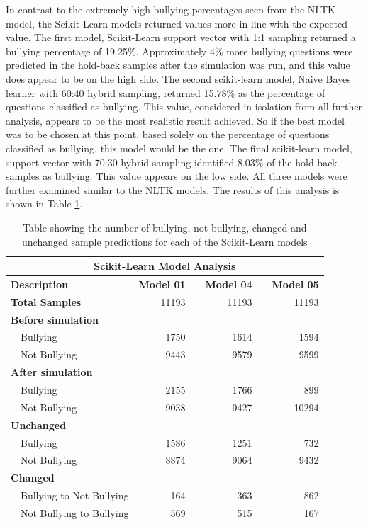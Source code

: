 In contrast to the extremely high bullying percentages seen from the NLTK model, the Scikit-Learn models returned values more in-line with the expected value. The first model, Scikit-Learn support vector with 1:1 sampling returned a bullying percentage of 19.25\%. Approximately 4\% more bullying questions were predicted in the hold-back samples after the simulation was run, and this value does appear to be on the high side. The second scikit-learn model, Naive Bayes learner with 60:40 hybrid sampling, returned 15.78\% as the percentage of questions classified as bullying. This value, considered in isolation from all further analysis, appears to be the most realistic result achieved. So if the best model was to be chosen at this point, based solely on the percentage of questions classified as bullying, this model would be the one. The final scikit-learn model, support vector with 70:30 hybrid sampling identified 8.03\% of the hold back samples as bullying. This value appears on the low side. All three models were further examined similar to the NLTK models. The results of this analysis is shown in Table \ref{tab:chapter5:scikit_model_analysis}.

\begin{table}[h]
\centering
\caption[Scikit-Learn Models, analysis of samples predicted]{Table showing the number of bullying, not bullying, changed and unchanged sample predictions for each of the Scikit-Learn models}
\label{tab:chapter5:scikit_model_analysis}
\begin{tabular}{llrcrcr}
	\multicolumn{7}{c}{\textbf{Scikit-Learn Model Analysis}}  \\
    \toprule
	\multicolumn{2}{l}{\textbf{Description }} & \textbf{Model 01} &  &  \textbf{Model 04}  &  &  \textbf{Model 05} \\
    \midrule
	\multicolumn{2}{l}{\textbf{Total Samples}} & 11193 &  & 11193   &  & 11193  \\
	\multicolumn{2}{l}{\textbf{Before simulation}} &  &  &  & &  \\
	 & Bullying     & 1750 &  & 1614   &  & 1594  \\
	 & Not Bullying & 9443 &  & 9579  &  & 9599   \\
	\multicolumn{2}{l}{\textbf{After simulation}} &  &  &  & & \\
	 & Bullying     & 2155 &  & 1766  &  & 899   \\
	 & Not Bullying & 9038 &  & 9427   &  & 10294  \\
	\multicolumn{2}{l}{\textbf{Unchanged}} &  &  &  &  & \\
	 & Bullying     & 1586 &  & 1251  &  & 732   \\
	 & Not Bullying & 8874 &  & 9064  &  & 9432   \\
	\multicolumn{2}{l}{\textbf{Changed}} &  &  & & &  \\
	 & Bullying to Not Bullying  & 164 &  & 363  &  & 862   \\
	 & Not Bullying  to Bullying & 569 &  & 515  &  & 167   \\
	\bottomrule
	\end{tabular}
\end{table}

